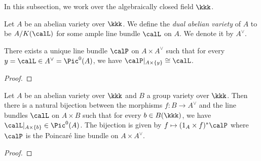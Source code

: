     In this subsection, we work over the algebraically closed field \(\kkk\).


    \begin{definition}\label{def:dual_abelian_variety}
        Let \(A\) be an abelian variety over \(\kkk\).
        We define the \emph{dual abelian variety} of \(A\) to be \(A/K(\calL)\) for some ample line bundle \(\calL\) on \(A\).
        We denote it by \(A^\vee\).
    \end{definition}


    \begin{lemma}\label{prop: the Poincare line bundle}
        There exists a unique line bundle \(\calP\) on \(A \times A^\vee\) such that for every \(y = \calL \in A^\vee = \Pic^0(A)\), we have \(\calP|_{A \times \{y\}} \cong \calL\).
    \end{lemma}
    \begin{proof}
    \end{proof}

    \begin{lemma}\label{prop:universal_property_of_dual_abelian_variety}
        Let \(A\) be an abelian variety over \(\kkk\) and \(B\) a group variety over \(\kkk\).
        Then there is a natural bijection between the morphisms \(f: B \to A^\vee\) and the line bundles \(\calL\) on \(A \times B\) such that for every \(b \in B(\kkk)\), we have \(\calL|_{A \times \{b\}} \in \Pic^0(A)\).
        The bijection is given by \(f \mapsto (1_A \times f)^*\calP\) where \(\calP\) is the Poincar\'e line bundle on \(A \times A^\vee\).
    \end{lemma}
    \begin{proof}
    \end{proof}

